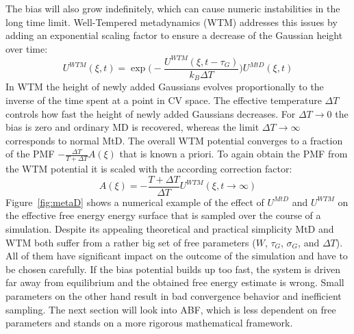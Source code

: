 The bias will also grow indefinitely, which can cause numeric instabilities in the long time limit.
Well-Tempered metadynamics (WTM)\autocite{barducci2008well} addresses this issues by adding an exponential scaling factor to ensure a decrease of the Gaussian height over time:
\begin{equation}
  U^{WTM}(\xi,t) = \exp \biggl(-\frac{U^{WTM}(\xi,t-\tau_G)}{k_B \Delta T}\biggr) U^{MtD}(\xi,t)
  \label{eq:WTM}
\end{equation}
In WTM the height of newly added Gaussians evolves proportionally to the inverse of the time spent at a point in CV space. The effective temperature $\Delta T$ controls how fast the height of newly added Gaussians decreases.
For $\Delta T \to 0$ the bias is zero and ordinary MD is recovered, whereas the limit $\Delta T \to \infty$ corresponds to normal MtD.
The overall WTM potential converges to a fraction of the PMF $-\frac{\Delta T}{T+\Delta T}A(\xi)$ that is known a priori.\autocite{barducci2008well}
To again obtain the PMF from the WTM potential it is scaled with the according correction factor:
\begin{equation}
A(\xi) = -\frac{T+\Delta T}{\Delta T}U^{WTM}(\xi, t\to \infty) \label{eq:F est WTM}
\end{equation}
Figure~\ref{fig:metaD} shows a numerical example of the effect of $U^{MtD}$ and $U^{WTM}$ on the effective free energy energy surface that is sampled over the course of a simulation.
Despite its appealing theoretical and practical simplicity MtD and WTM both suffer from a rather big set of free parameters ($W$, $\tau_G$, $\sigma_G$, and $\Delta T$). All of them have significant impact on the outcome of the simulation and have to be chosen carefully. If the bias potential builds up too fast, the system is driven far away from equilibrium and the obtained free energy estimate is wrong. Small parameters on the other hand result in bad convergence behavior and inefficient sampling.\autocite{laio2005assessing}
The next section will look into ABF, which is less dependent on free parameters and stands on a more rigorous mathematical framework.


